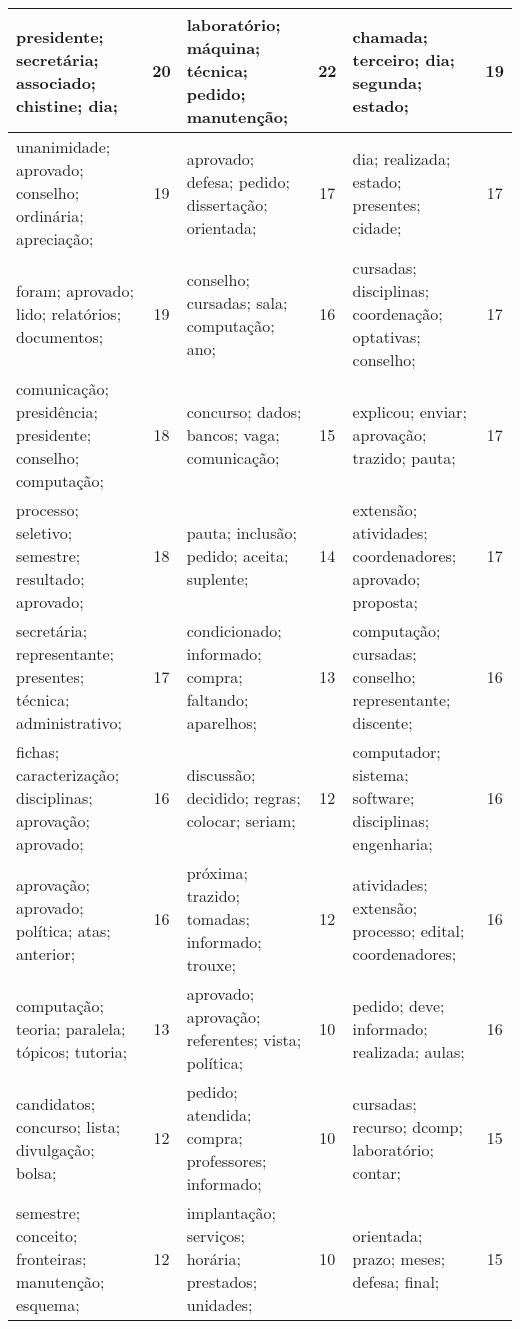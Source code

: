 \begin{table}[!h]
\begin{tabular}{|l|c||l|c||l|c|}
   presidente; secretária; associado; chistine; dia;    &   20  &         laboratório; máquina; técnica; pedido; manutenção;    &   22  &       chamada; terceiro; dia; segunda; estado;    &   19  \\ \hline
   unanimidade; aprovado; conselho; ordinária; apreciação;    &   19  &         aprovado; defesa; pedido; dissertação; orientada;    &   17  &       dia; realizada; estado; presentes; cidade;    &   17  \\ \hline
   foram; aprovado; lido; relatórios; documentos;    &   19  &         conselho; cursadas; sala; computação; ano;    &   16  &       cursadas; disciplinas; coordenação; optativas; conselho;    &   17  \\ \hline
   comunicação; presidência; presidente; conselho; computação;    &   18  &         concurso; dados; bancos; vaga; comunicação;    &   15  &       explicou; enviar; aprovação; trazido; pauta;    &   17  \\ \hline
   processo; seletivo; semestre; resultado; aprovado;    &   18  &         pauta; inclusão; pedido; aceita; suplente;    &   14  &       extensão; atividades; coordenadores; aprovado; proposta;    &   17  \\ \hline
   secretária; representante; presentes; técnica; administrativo;    &   17  &         condicionado; informado; compra; faltando; aparelhos;    &   13  &       computação; cursadas; conselho; representante; discente;    &   16  \\ \hline
   fichas; caracterização; disciplinas; aprovação; aprovado;    &   16  &         discussão; decidido; regras; colocar; seriam;    &   12  &       computador; sistema; software; disciplinas; engenharia;    &   16  \\ \hline
   aprovação; aprovado; política; atas; anterior;    &   16  &         próxima; trazido; tomadas; informado; trouxe;    &   12  &       atividades; extensão; processo; edital; coordenadores;    &   16  \\ \hline
   computação; teoria; paralela; tópicos; tutoria;    &   13  &         aprovado; aprovação; referentes; vista; política;    &   10  &       pedido; deve; informado; realizada; aulas;    &   16  \\ \hline
   candidatos; concurso; lista; divulgação; bolsa;    &   12  &         pedido; atendida; compra; professores; informado;    &   10  &       cursadas; recurso; dcomp; laboratório; contar;    &   15  \\ \hline
   semestre; conceito; fronteiras; manutenção; esquema;    &   12  &         implantação; serviços; horária; prestados; unidades;    &   10  &       orientada; prazo; meses; defesa; final;    &   15  \\ \hline

\end{tabular}
\end{table}
